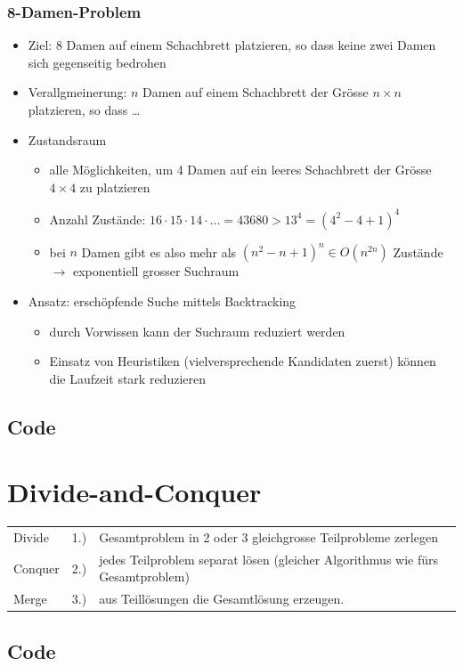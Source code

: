 \documentclass[a4paper,10pt]{article}
\begin{document}
\subsubsection{8-Damen-Problem}
\begin{itemize}
\item Ziel: 8 Damen auf einem Schachbrett platzieren, so dass keine zwei Damen sich gegenseitig bedrohen
\item Verallgmeinerung: $n$ Damen auf einem Schachbrett der Gr\"osse $n\times n$ platzieren, so dass \dots
\item Zustandsraum
	\begin{itemize}
	\item alle M\"oglichkeiten, um 4 Damen auf ein leeres Schachbrett der Gr\"osse $4\times 4$ zu platzieren
	\item Anzahl Zust\"ande: $16\cdot 15\cdot 14\cdot\dots = 43680 > 13^4 = (4^2-4+1)^4$
	\item bei $n$ Damen gibt es also mehr als $(n^2-n+1)^n\in O(n^{2n})$ Zust\"ande $\to$ exponentiell grosser Suchraum
	\end{itemize}
\item Ansatz: ersch\"opfende Suche mittels Backtracking
	\begin{itemize}
	\item durch Vorwissen kann der Suchraum reduziert werden
	\item Einsatz von Heuristiken (vielversprechende Kandidaten zuerst) k\"onnen die Laufzeit stark reduzieren
	\end{itemize}
\end{itemize}
\pagebreak
\subsection{Code}

\pagebreak
\section{Divide-and-Conquer}
\begin{tabular}{lll}
Divide &1.) &Gesamtproblem in 2 oder 3 gleichgrosse Teilprobleme zerlegen\\
Conquer &2.) &jedes Teilproblem separat l\"osen (gleicher Algorithmus wie f\"urs Gesamtproblem)\\
Merge &3.) &aus Teill\"osungen die Gesamtl\"osung erzeugen.\\
\end{tabular}
\subsection{Code}

\end{document}
